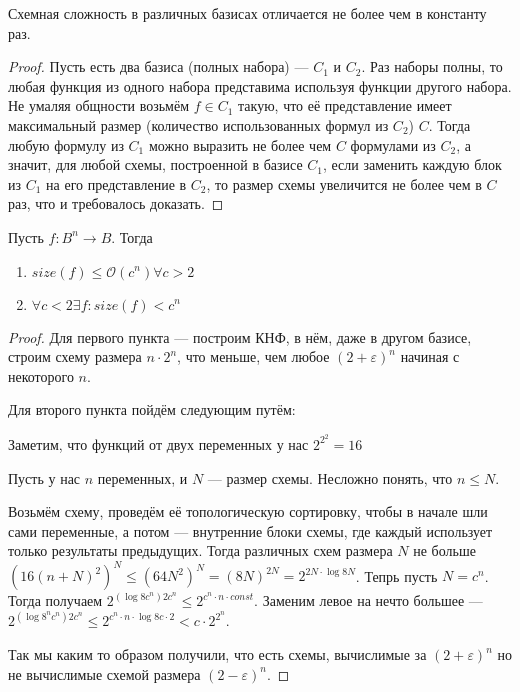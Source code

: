 \begin{theorem}
	Схемная сложность в различных базисах отличается не более чем в константу раз.
\end{theorem}
\begin{proof}
	Пусть есть два базиса (полных набора) --- $C_1$ и $C_2$. Раз наборы полны, то любая функция из одного набора представима используя функции другого набора. Не умаляя общности возьмём $f \in C_1$ такую, что её представление имеет максимальный размер (количество использованных формул из $C_2$) $C$. Тогда любую формулу из $C_1$ можно выразить не более чем $C$  формулами из $C_2$, а значит, для любой схемы, построенной в базисе $C_1$, если заменить каждую блок из $C_1$ на его представление в $C_2$, то размер схемы увеличится не более чем в $C$ раз, что и требовалось доказать.
\end{proof}

\begin{theorem}
	Пусть $f: B^n \to B$. Тогда

	\begin{enumerate}
		\item{$size(f) \le \mathcal{O}(c^n) \forall c > 2$}
		\item{$\forall c < 2 \exists f : size(f) < c^n$}
	\end{enumerate}
\end{theorem}
\begin{proof}
	Для первого пункта --- построим КНФ, в нём, даже в другом базисе, строим схему размера $n \cdot 2^n$, что меньше, чем любое $(2 + \varepsilon)^n$ начиная с некоторого $n$. 

	Для второго пункта пойдём следующим путём:
	
	Заметим, что функций от двух переменных у нас $2^{2^2} = 16$

	Пусть у нас $n$ переменных, и $N$ --- размер схемы. Несложно понять, что $n \le N$. 

	Возьмём схему, проведём её топологическую сортировку, чтобы в начале шли сами переменные, а потом --- внутренние блоки схемы, где каждый использует только результаты предыдущих.
	Тогда различных схем размера $N$ не больше $(16(n + N)^2)^N \le (64N^2)^N = (8N)^{2N} = 2^{2N \cdot \log 8N}$. Тепрь пусть $N = c^n$. Тогда получаем $2^{(\log 8c^n) 2c^n} \le 2^{c^n \cdot n \cdot const}$. Заменим левое на нечто большее --- $2^{(\log 8^n c^n) 2 c^n} \le 2^{c^n \cdot n \cdot \log 8c \cdot 2} < c\cdot 2^{2^n}$.

	Так мы каким то образом получили, что есть схемы, вычислимые за $(2+\varepsilon)^n$ но не вычислимые схемой размера $(2-\varepsilon)^n$.
\end{proof}


